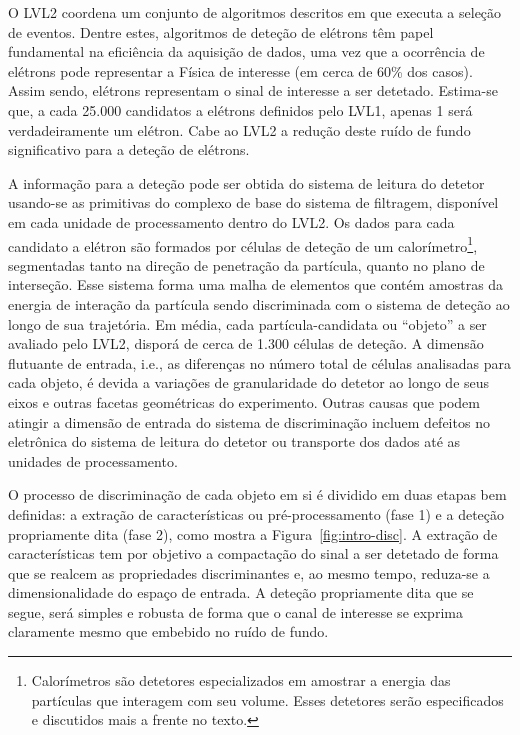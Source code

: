 O LVL2 coordena um conjunto de algoritmos descritos em  que
executa a seleção de eventos. Dentre estes, algoritmos de deteção de elétrons
têm papel fundamental na eficiência da aquisição de dados, uma vez que a
ocorrência de elétrons pode representar a Física de interesse (em cerca de
60\% dos casos). Assim sendo, elétrons representam o sinal de interesse a ser
detetado. Estima-se que, a cada 25.000 candidatos a elétrons definidos pelo
LVL1, apenas 1 será verdadeiramente um elétron. Cabe ao LVL2 a redução deste
ruído de fundo significativo para a deteção de elétrons.

A informação para a deteção pode ser obtida do sistema de leitura do detetor
usando-se as primitivas do complexo  de base do sistema de
filtragem, disponível em cada unidade de processamento dentro do LVL2. Os
dados para cada candidato a elétron são formados por células de deteção de um
calorímetro\footnote{Calorímetros são detetores especializados em amostrar a
energia das partículas que interagem com seu volume. Esses detetores serão
especificados e discutidos mais a frente no texto.}, segmentadas tanto na
direção de penetração da partícula, quanto no plano de interseção. Esse
sistema forma uma malha de elementos que contém amostras da energia de
interação da partícula sendo discriminada com o sistema de deteção ao longo
de sua trajetória. Em média, cada partícula-candidata ou ``objeto'' a ser
avaliado pelo LVL2, disporá de cerca de 1.300 células de deteção. A dimensão
flutuante de entrada, i.e., as diferenças no número total de células
analisadas para cada objeto, é devida a variações de granularidade do detetor
ao longo de seus eixos e outras facetas geométricas do experimento. Outras
causas que podem atingir a dimensão de entrada do sistema de discriminação
incluem defeitos no eletrônica do sistema de leitura do detetor ou transporte
dos dados até as unidades de processamento.

O processo de discriminação de cada objeto em si é dividido em duas etapas bem
definidas: a extração de características ou pré-processamento (fase 1) e a
deteção propriamente dita (fase 2), como mostra a
Figura~\ref{fig:intro-disc}. A extração de características tem por objetivo a
compactação do sinal a ser detetado de forma que se realcem as propriedades
discriminantes e, ao mesmo tempo, reduza-se a dimensionalidade do espaço de
entrada. A deteção propriamente dita que se segue, será simples e robusta de
forma que o canal de interesse se exprima claramente mesmo que embebido no
ruído de fundo.

